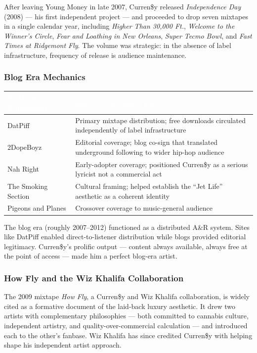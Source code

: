 \documentclass[11pt,letterpaper]{article}
\newcommand{\tableheader}[1]{\textbf{\sffamily\textcolor{white}{#1}}}
\begin{document}
After leaving Young Money in late 2007, Curren\$y released \textit{Independence Day} (2008) — his first independent project — and proceeded to drop seven mixtapes in a single calendar year, including \textit{Higher Than 30,000 Ft.}, \textit{Welcome to the Winner's Circle}, \textit{Fear and Loathing in New Orleans}, \textit{Super Tecmo Bowl}, and \textit{Fast Times at Ridgemont Fly}. The volume was strategic: in the absence of label infrastructure, frequency of release is audience maintenance.

\subsubsection{Blog Era Mechanics}

\begin{center}
\begin{tabularx}{\textwidth}{L{3.5cm}X}
\toprule
{}
\tableheader{Platform / Publication} & \tableheader{Role in Curren\$y's Rise} \\
\midrule
DatPiff & Primary mixtape distribution; free downloads circulated independently of label infrastructure \\
2DopeBoyz & Editorial coverage; blog co-sign that translated underground following to wider hip-hop audience \\
Nah Right & Early-adopter coverage; positioned Curren\$y as a serious lyricist not a commercial act \\
The Smoking Section & Cultural framing; helped establish the ``Jet Life'' aesthetic as a coherent identity \\
Pigeons and Planes & Crossover coverage to music-general audience \\
\bottomrule
\end{tabularx}
\end{center}

The blog era (roughly 2007–2012) functioned as a distributed A\&R system. Sites like DatPiff enabled direct-to-listener distribution while blogs provided editorial legitimacy. Curren\$y's prolific output — content always available, always free at the point of access — made him a perfect blog-era artist.

\subsubsection{How Fly and the Wiz Khalifa Collaboration}

The 2009 mixtape \textit{How Fly}, a Curren\$y and Wiz Khalifa collaboration, is widely cited as a formative document of the laid-back luxury aesthetic. It drew two artists with complementary philosophies — both committed to cannabis culture, independent artistry, and quality-over-commercial calculation — and introduced each to the other's fanbase. Wiz Khalifa has since credited Curren\$y with helping shape his independent artist approach.
\end{document}
